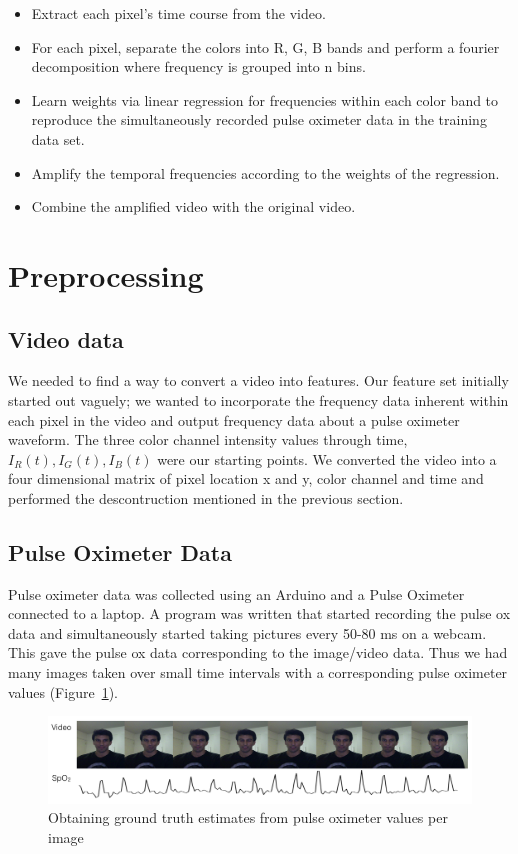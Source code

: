 \documentclass[12pt]{article}
\begin{document}
\begin{itemize}
\item Extract each pixel’s time course from the video. 
\item For each pixel, separate the colors into R, G, B bands and perform a fourier decomposition where frequency is grouped into n bins.
\item Learn weights via linear regression for frequencies within each color band to reproduce the simultaneously recorded pulse oximeter data in the training data set. 
\item Amplify the temporal frequencies according to the weights of the regression.
\item Combine the amplified video with the original video.
\end{itemize}


  


\section{Preprocessing}
\subsection*{Video data}
  We needed to find a way to convert a video into features.
  Our feature set initially started out vaguely; we wanted to incorporate the frequency data inherent within each pixel in the video and output frequency data about a pulse oximeter waveform.
  The three color channel intensity values through time, \(I_R(t), I_G(t), I_B(t)\) were our starting points.
  We converted the video into a four dimensional matrix of pixel location x and y, color channel and time and performed the descontruction mentioned in the previous section.
  
\subsection*{Pulse Oximeter Data}
  Pulse oximeter data was collected using an Arduino and a Pulse Oximeter connected to a laptop. 
  A program was written that started recording the pulse ox data and simultaneously started taking pictures every 50-80 ms on a webcam.
  This gave the pulse ox data corresponding to the image/video data.
  Thus we had many images taken over small time intervals with a corresponding pulse oximeter values (Figure~\ref{figure:images_and_pulseox}).

  \begin{figure}
    \captionsetup{justification=centering}
    \includegraphics[width=\textwidth]{images/fig3.png}
    \caption{Obtaining ground truth estimates from pulse oximeter values per image \label{figure:images_and_pulseox}}
  \end{figure}
\end{document}
